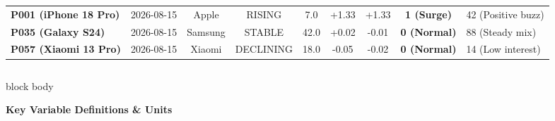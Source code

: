 \documentclass[aspectratio=169, 10pt]{beamer}
\newenvironment{card}[1][]{%
        \begin{beamercolorbox}[rounded=true,shadow=false,wd=\linewidth,sep=3.5pt,#1]{block body}%
        \fontsize{7.8pt}{9.8pt}\selectfont%
    }{%
        \end{beamercolorbox}%
    }
\begin{document}
\begin{frame}[t]
\begin{table}[h]
\begin{tabular}{llccccccl}
                \midrule                                                                                                                                                                               
                \textbf{P001 (iPhone 18 Pro)} & 2026-08-15 & Apple & RISING & 7.0 & +1.33 & +1.33 & \textbf{1 (Surge)} & 42 (Positive buzz) \\                                                         
                \textbf{P035 (Galaxy S24)} & 2026-08-15 & Samsung & STABLE & 42.0 & +0.02 & -0.01 & \textbf{0 (Normal)} & 88 (Steady mix) \\                                                           
                \textbf{P057 (Xiaomi 13 Pro)} & 2026-08-15 & Xiaomi & DECLINING & 18.0 & -0.05 & -0.02 & \textbf{0 (Normal)} & 14 (Low interest) \\                                                    
                \bottomrule                                                                                                                                                                            
            \end{tabular}                                                                                                                                                                              
        \end{table}                                                                                                                                                                                    
        \vspace{-0.15cm}                                                                                                                                                                               
        \begin{columns}[T]                                                                                                                                                                             
            \begin{column}{0.49\textwidth}                                                                                                                                                             
                \begin{card}                                                                                                                                                                           
                    {\fontsize{7.5pt}{9pt}\selectfont \textbf{\color{NavyPrimary}Key Variable Definitions \& Units}}\\[0.04cm]                                                                         

\end{card}
\end{column}
\end{columns}
\end{frame}
\end{document}
